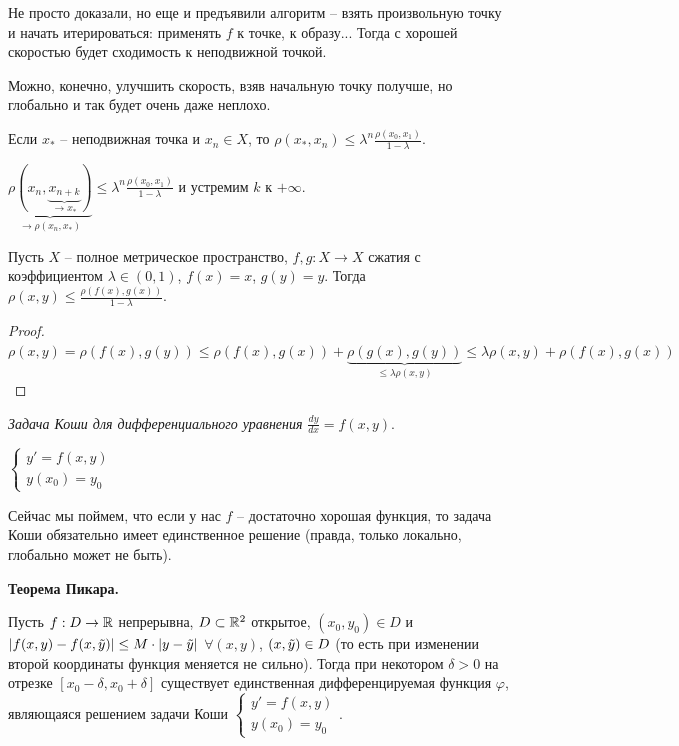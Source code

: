 \begin{remark}
    Не просто доказали, но еще и предъявили алгоритм – взять произвольную точку и начать итерироваться: применять $f$ к точке, к образу... Тогда с хорошей скоростью будет сходимость к неподвижной точкой.

    Можно, конечно, улучшить скорость, взяв начальную точку получше, но глобально и так будет очень даже неплохо.
\end{remark}

\begin{remark}
    Если $x_*$ – неподвижная точка и $x_n\in X$, то $\rho(x_*, x_n)\leq \lambda^n\frac{\rho(x_0, x_1)}{1-\lambda}$.

    $\underbrace{\rho(x_n, \underbrace{x_{n+k}}_{\rightarrow x_*})}_{\rightarrow \rho(x_n, x_*)}\leq \lambda^n\frac{\rho(x_0, x_1)}{1-\lambda}$ и устремим $k$ к $+\infty$.
\end{remark}

\begin{corollary}
    Пусть $X$ –  полное метрическое пространство, $f, g:X\rightarrow X$ сжатия с коэффициентом $\lambda \in (0, 1)$, $f(x) = x$, $g(y)=y$. Тогда $\rho(x, y)\leq \frac{\rho(f(x), g(x))}{1-\lambda}$.
\end{corollary}

\begin{proof}
    $\rho(x, y)=\rho(f(x), g(y))\leq \rho(f(x), g(x))+\underbrace{\rho(g(x), g(y))}_{\leq \lambda \rho(x, y)}\leq \lambda \rho(x, y)+\rho(f(x), g(x))$
\end{proof}

\begin{definition}
    \textit{Задача Коши для дифференциального уравнения }$\frac{dy}{dx}=f(x, y)$.

    $\left\{\begin{array}{l}
         y'=f(x, y)  \\
         y(x_0)=y_0
    \end{array}\right.$
\end{definition}

Сейчас мы поймем, что если у нас $f$ – достаточно хорошая функция, то задача Коши обязательно имеет единственное решение (правда, только локально, глобально может не быть).

\begin{theorem}
    \textbf{Теорема Пикара.}

    Пусть $f:D\rightarrow \mathbb{R}$ непрерывна, $D\subset \mathbb{R}^2$ открытое, $(x_0, y_0)\in D$ и $|f(x, y)-f(x, \Tilde{y})|\leq M\cdot |y-\Tilde{y}|$ $\forall (x, y)$, $(x, \Tilde{y})\in D$ (то есть при изменении второй координаты функция меняется не сильно). Тогда при некотором $\delta >0$ на отрезке $[x_0 - \delta, x_0 + \delta]$ существует единственная дифференцируемая функция $\varphi$, являющаяся решением задачи Коши $\left\{\begin{array}{l}
         y'=f(x, y)  \\
         y(x_0)=y_0
    \end{array}\right.$.
\end{theorem}

